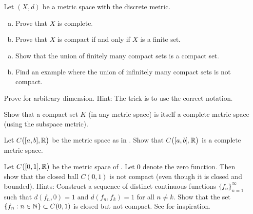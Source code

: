 \begin{exercise}
Let $(X,d)$ be a metric space with the discrete metric.
\begin{enumerate}[a)]
\item
Prove that $X$ is complete.
\item
Prove that $X$ is compact if and only if $X$ is a finite set.
\end{enumerate}
\end{exercise}

\begin{exercise}
\leavevmode
\begin{enumerate}[a)]
\item
Show that the union of finitely many compact sets is a compact set.
\item
Find an example where the union of infinitely many compact sets is not
compact.
\end{enumerate}
\end{exercise}

\begin{exercise}
Prove  for arbitrary dimension.
Hint: The trick is to use the correct notation.
\end{exercise}

\begin{exercise} \label{exercise:subspacecompact}
Show that a compact set $K$ (in any metric space)
is itself a complete metric space (using the subspace metric).
\end{exercise}

\begin{exercise} \label{exercise:CabRcomplete}
Let $C\bigl([a,b],{\mathbb{R}}\bigr)$ be the metric space as in .  Show that
$C\bigl([a,b],{\mathbb{R}}\bigr)$ is a complete metric space.
\end{exercise}

\begin{exercise}[Challenging] \label{exercise:msclbounnotcompt}
Let $C\bigl([0,1],{\mathbb{R}}\bigr)$ be the metric space of .  Let $0$
denote the zero function.  Then show that the closed ball
$C(0,1)$ is not compact (even though it is closed and bounded).
Hints: Construct a sequence of distinct continuous functions
$\{ f_n \}_{n=1}^\infty$ such that
$d(f_n,0) = 1$ and $d(f_n,f_k) = 1$ for all $n \neq k$.  Show that
the set $\{ f_n : n \in {\mathbb{N}} \} \subset C(0,1)$ is closed but not compact.
See  for inspiration.
\end{exercise}

